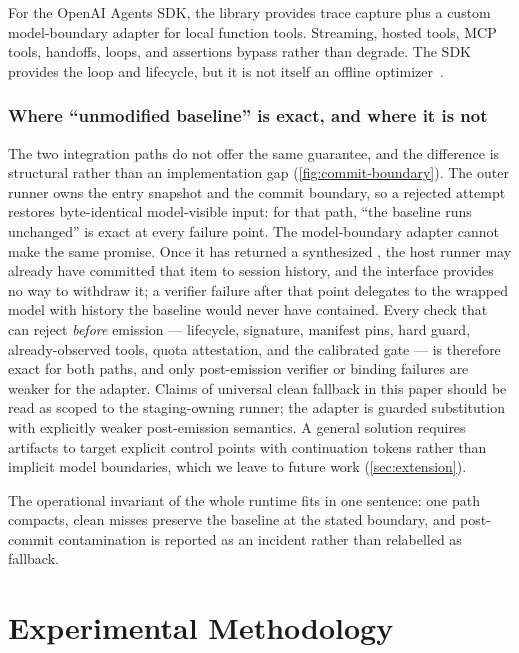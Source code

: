 For the OpenAI Agents SDK, the library provides trace capture plus a custom model-boundary
adapter for local function tools.  Streaming, hosted tools, MCP tools, handoffs, loops,
and assertions bypass rather than degrade.  The SDK provides the loop and lifecycle, but it
is not itself an offline optimizer~\cite{openai2026agents}.

\subsubsection{Where ``unmodified baseline'' is exact, and where it is not}
\label{sec:runtime-scope}

The two integration paths do not offer the same guarantee, and the difference is
structural rather than an implementation gap (\cref{fig:commit-boundary}).  The outer runner owns the entry snapshot and
the commit boundary, so a rejected attempt restores byte-identical model-visible input: for
that path, ``the baseline runs unchanged'' is exact at every failure point.  The
model-boundary adapter cannot make the same promise.  Once it has returned a synthesized
, the host runner may already have committed that item to session
history, and the  interface provides no way to withdraw it; a verifier failure
after that point delegates to the wrapped model with history the baseline would never have
contained.  Every check that can reject \emph{before} emission --- lifecycle, signature,
manifest pins, hard guard, already-observed tools, quota attestation, and the calibrated
gate --- is therefore exact for both paths, and only post-emission verifier or binding
failures are weaker for the adapter.  Claims of universal clean fallback in this paper
should be read as scoped to the staging-owning runner; the adapter is guarded substitution
with explicitly weaker post-emission semantics.  A general solution requires artifacts to
target explicit control points with continuation tokens rather than implicit model
boundaries, which we leave to future work (\cref{sec:extension}).

The operational invariant of the whole runtime fits in one sentence: one path compacts,
clean misses preserve the baseline at the stated boundary, and post-commit contamination
is reported as an incident rather than relabelled as fallback.

\section{Experimental Methodology}
\label{sec:methodology}

